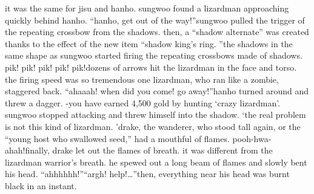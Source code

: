 it was the same for jisu and hanho.
 sungwoo found a lizardman approaching quickly behind hanho.
“hanho, get out of the way!”sungwoo pulled the trigger of the repeating crossbow from the shadows.
 then, a “shadow alternate” was created thanks to the effect of the new item “shadow king’s ring.
”the shadows in the same shape as sungwoo started firing the repeating crossbows made of shadows.
pik! pik! pik! pik! pik!dozens of arrows hit the lizardman in the face and torso.
 the firing speed was so tremendous one lizardman, who ran like a zombie, staggered back.
“ahaaah! when did you come! go away!”hanho turned around and threw a dagger.
-you have earned 4,500 gold by hunting ‘crazy lizardman’.
sungwoo stopped attacking and threw himself into the shadow.
‘the real problem is not this kind of lizardman.
’drake, the wanderer, who stood tall again, or the “young host who swallowed seed,” had a mouthful of flames.
pooh-hwa-ahah!finally, drake let out the flames of breath.
 it was different from the lizardman warrior’s breath.
 he spewed out a long beam of flames and slowly bent his head.
“ahhhhhh!”“argh! help!…”then, everything near his head was burnt black in an instant.

